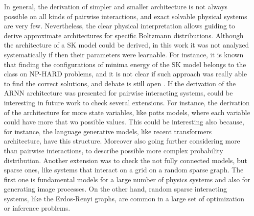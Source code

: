 \documentclass[aps,physrev,10pt,floatfix,reprint]{revtex4-2}
\begin{document}
In general, the derivation of simpler and smaller architecture is not always possible on all kinds of pairwise interactions, and exact solvable physical systems are very few. Nevertheless, the clear physical interpretation allows guiding to derive approximate architectures for specific Boltzmann distributions. Although the architecture of a SK model could be derived, in this work it was not analyzed systematically if then their parameters were learnable. For instance, it is known that finding the configurations of minima energy of the SK model belongs to the class on NP-HARD problems, and it is not clear if such approach was really able to find the correct solutions, and debate is still open \cite{}. 
If the derivation of the ARNN architecture was presented for pairwise interacting systems, could be interesting in future work to check several extensions. For instance, the derivation of the architecture for more state variables, like potts models, where each variable could have more that wo possible values. This could be interesting also because, for instance, the language generative models, like recent transformers architecture, have this structure. Moreover also going further considering more than pairwise interactions, to describe possible more complex probability distribution. Another extension was to check the not fully connected models, but sparse ones, like systems that interact on a grid on a random sparse graph. The first one is fundamental models for a large number of physics systems and also for generating image processes. On the other hand, random sparse interacting systems, like the Erdos-Renyi graphs, are common in a large set of optimization or inference problems.  
%

\end{document}
